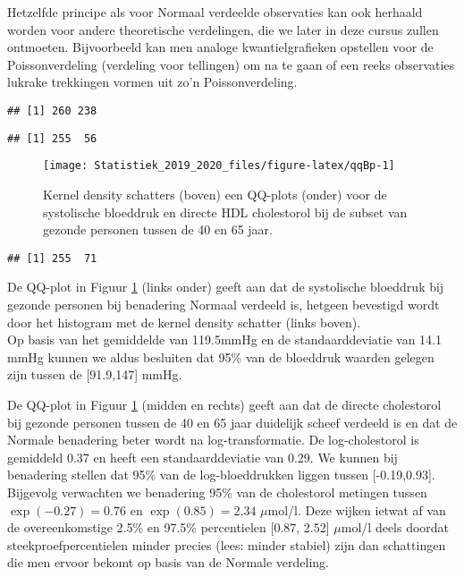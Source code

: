 \documentclass[12pt,dutch,coursenotes]{book}
\theoremstyle{definition}
\theoremstyle{definition}
\theoremstyle{definition}
\theoremstyle{remark}
\let\BeginKnitrBlock\begin \let\EndKnitrBlock\end
\begin{document}
Hetzelfde principe als voor Normaal verdeelde observaties kan ook
herhaald worden voor andere theoretische verdelingen, die we later in
deze cursus zullen ontmoeten. Bijvoorbeeld kan men analoge
kwantielgrafieken opstellen voor de Poissonverdeling (verdeling voor
tellingen) om na te gaan of een reeks observaties lukrake trekkingen
vormen uit zo'n Poissonverdeling.

\BeginKnitrBlock{example}[NHANES vervolg]
\protect\hypertarget{exm:unnamed-chunk-54}{}{\label{exm:unnamed-chunk-54}
\iffalse (NHANES vervolg) \fi{} }
\EndKnitrBlock{example}

\begin{verbatim}
## [1] 260 238
\end{verbatim}

\begin{verbatim}
## [1] 255  56
\end{verbatim}

\begin{figure}

{\centering \texttt{[image: Statistiek\_2019\_2020\_files/figure-latex/qqBp-1]} 

}

\caption{Kernel density schatters (boven) een QQ-plots (onder) voor de systolische bloeddruk en directe HDL cholestorol bij de subset van gezonde personen tussen de 40 en 65 jaar.}\label{fig:qqBp}
\end{figure}

\begin{verbatim}
## [1] 255  71
\end{verbatim}

De QQ-plot in Figuur \ref{fig:qqBp} (links onder) geeft aan dat de
systolische bloeddruk bij gezonde personen bij benadering Normaal
verdeeld is, hetgeen bevestigd wordt door het histogram met de kernel
density schatter (links boven).\\
Op basis van het gemiddelde van 119.5mmHg en de standaarddeviatie van
14.1 mmHg kunnen we aldus besluiten dat 95\% van de bloeddruk waarden
gelegen zijn tussen de {[}91.9,147{]} mmHg.

De QQ-plot in Figuur \ref{fig:qqBp} (midden en rechts) geeft aan dat de
directe cholestorol bij gezonde personen tussen de 40 en 65 jaar
duidelijk scheef verdeeld is en dat de Normale benadering beter wordt na
log-transformatie. De log-cholestorol is gemiddeld 0.37 en heeft een
standaarddeviatie van 0.29. We kunnen bij benadering stellen dat 95\%
van de log-bloeddrukken liggen tussen {[}-0.19,0.93{]}. Bijgevolg
verwachten we benadering 95\% van de cholestorol metingen tussen
\(\exp(-0.27)=0.76\) en \(\exp(0.85)=2.34\) \(\mu\)mol/l. Deze wijken
ietwat af van de overeenkomstige 2.5\% en 97.5\% percentielen {[}0.87,
2.52{]} \(\mu\)mol/l deels doordat steekproefpercentielen minder precies
(lees: minder stabiel) zijn dan schattingen die men ervoor bekomt op
basis van de Normale verdeling.
\end{document}
